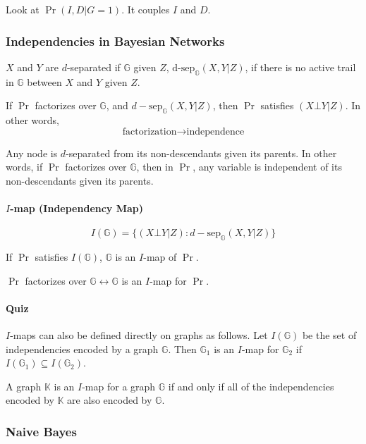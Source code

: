 \documentclass[12pt]{article}
\begin{document}
Look at $\Pr(I, D| G = 1)$.  It couples $I$ and $D$.


\subsubsection{Independencies in Bayesian Networks}
$X$ and $Y$ are $d$-separated if $\mathbb{G}$ given $Z$,
$\text{d-sep}_{\mathbb{G}}(X, Y|Z)$,
if there is no active trail in $\mathbb{G}$ between $X$
and $Y$ given $Z$.

If $\Pr$ factorizes over $\mathbb{G}$, and $d-\text{sep}_{\mathbb{G}}(X, Y|Z)$, then $\Pr$ satisfies $(X \bot Y | Z)$.
In other words,
\begin{equation*}
  \text{factorization} \rightarrow \text{independence}
\end{equation*}

Any node is $d$-separated from its non-descendants given its parents.
In other words, if $\Pr$ factorizes over $\mathbb{G}$, then in $\Pr$,
any variable is independent of its non-descendants given its parents.


\paragraph{$I$-map (Independency Map)}

\begin{equation*}
  I(\mathbb{G}) = \{ (X \bot Y | Z) : d-\text{sep}_{\mathbb{G}}(X, Y|Z) \}
\end{equation*}

If $\Pr$ satisfies $I(\mathbb{G})$, $\mathbb{G}$ is an $I$-map of $\Pr$.

$\Pr$ factorizes over $\mathbb{G} \leftrightarrow \mathbb{G}$ is an $I$-map for $\Pr$.

\paragraph{Quiz}

$I$-maps can also be defined directly on graphs as follows. Let $I(\mathbb{G})$ be the set of independencies encoded by a graph $\mathbb{G}$. Then $\mathbb{G}_1$ is an $I$-map for $\mathbb{G}_2$ if $I(\mathbb{G}_1) \subseteq I(\mathbb{G}_2)$.

A graph $\mathbb{K}$ is an $I$-map for a graph $\mathbb{G}$ if and only if all of the independencies encoded by $\mathbb{K}$ are also encoded by $\mathbb{G}$.

\subsubsection{Naive Bayes}
\end{document}
